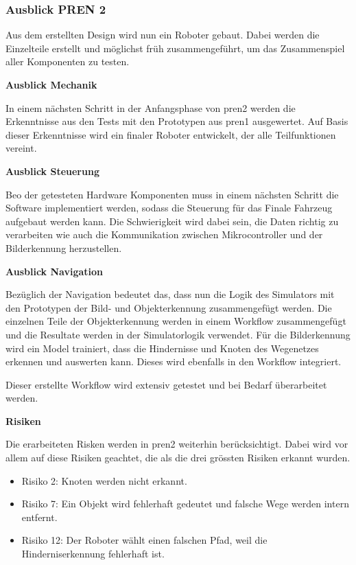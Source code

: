 \subsubsection{Ausblick PREN 2}

Aus dem erstellten Design wird nun ein Roboter gebaut. Dabei werden die Einzelteile erstellt und möglichst früh zusammengeführt, um das Zusammenspiel aller Komponenten zu testen.

\textbf{Ausblick Mechanik}

In einem nächsten Schritt in der Anfangsphase von \acrshort{pren2} werden die Erkenntnisse aus den Tests mit den Prototypen aus \acrshort{pren1} ausgewertet. Auf Basis dieser Erkenntnisse wird ein finaler Roboter entwickelt, der alle Teilfunktionen vereint.   

\textbf{Ausblick Steuerung}

Beo der getesteten Hardware Komponenten  muss in einem nächsten Schritt die Software implementiert werden, sodass die Steuerung für das Finale Fahrzeug aufgebaut werden kann. Die Schwierigkeit wird dabei sein, die Daten richtig zu verarbeiten wie auch die Kommunikation zwischen Mikrocontroller und der Bilderkennung herzustellen.

\textbf{Ausblick Navigation}

Bezüglich der Navigation bedeutet das, dass nun die Logik des Simulators mit den Prototypen der Bild- und Objekterkennung zusammengefügt werden. Die einzelnen Teile der Objekterkennung werden in einem Workflow zusammengefügt und die Resultate werden in der Simulatorlogik verwendet. Für die Bilderkennung wird ein Model trainiert, dass die Hindernisse und Knoten des Wegenetzes erkennen und auswerten kann. Dieses wird ebenfalls in den Workflow integriert.

Dieser erstellte Workflow wird extensiv getestet und bei Bedarf überarbeitet werden.

\textbf{Risiken}

Die erarbeiteten Risken werden in \acrshort{pren2} weiterhin berücksichtigt. Dabei wird vor allem auf diese Risiken geachtet, die als die drei grössten Risiken erkannt wurden.

\begin{itemize}
    \item Risiko 2: Knoten werden nicht erkannt.
    \item Risiko 7: Ein Objekt wird fehlerhaft gedeutet und falsche Wege werden intern entfernt.
    \item Risiko 12: Der Roboter wählt einen falschen Pfad, weil die Hinderniserkennung fehlerhaft ist.
\end{itemize}

